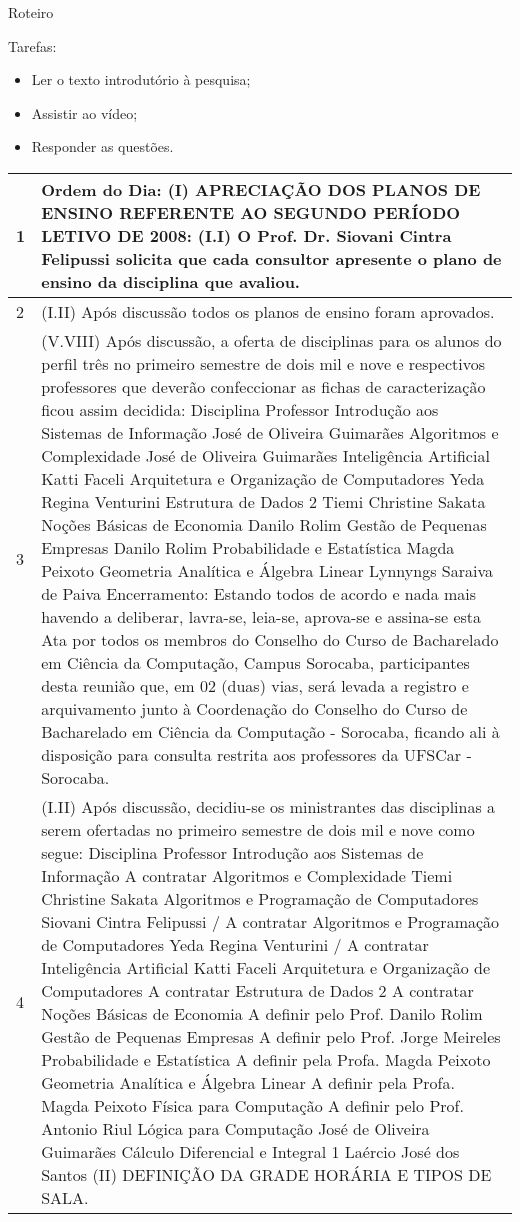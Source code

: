 \documentclass{article}
\begin{document}
Roteiro

Tarefas:

\begin{itemize}
	\item Ler o texto introdutório à pesquisa;
	\item Assistir ao vídeo;
	\item Responder as questões.
\end{itemize}





\begin{longtable}{|p{0.2cm}|p{17cm}|}
\hline 
1 & 
Ordem do Dia: (I) APRECIAÇÃO DOS PLANOS DE ENSINO REFERENTE AO SEGUNDO PERÍODO LETIVO DE 2008: (I.I) O Prof. Dr. Siovani Cintra Felipussi solicita que cada consultor apresente o plano de ensino da disciplina que avaliou.
 \\ \hline 
2 &
(I.II) Após discussão todos os planos de ensino foram aprovados.
 \\ \hline 
3 &
(V.VIII) Após discussão, a oferta de disciplinas para os alunos do perfil três no primeiro semestre de dois mil e nove e respectivos professores que deverão confeccionar as fichas de caracterização ficou assim decidida: Disciplina Professor Introdução aos Sistemas de Informação José de Oliveira Guimarães Algoritmos e Complexidade José de Oliveira Guimarães Inteligência Artificial Katti Faceli Arquitetura e Organização de Computadores Yeda Regina Venturini Estrutura de Dados 2 Tiemi Christine Sakata Noções Básicas de Economia Danilo Rolim Gestão de Pequenas Empresas Danilo Rolim Probabilidade e Estatística Magda Peixoto Geometria Analítica e Álgebra Linear Lynnyngs Saraiva de Paiva Encerramento: Estando todos de acordo e nada mais havendo a deliberar, lavra-se, leia-se, aprova-se e assina-se esta Ata por todos os membros do Conselho do Curso de Bacharelado em Ciência da Computação, Campus Sorocaba, participantes desta reunião que, em 02 (duas) vias, será levada a registro e arquivamento junto à Coordenação do Conselho do Curso de Bacharelado em Ciência da Computação - Sorocaba, ficando ali à disposição para consulta restrita aos professores da UFSCar - Sorocaba.
 \\ \hline 
4 &
(I.II) Após discussão, decidiu-se os ministrantes das disciplinas a serem ofertadas no primeiro semestre de dois mil e nove como segue: Disciplina Professor Introdução aos Sistemas de Informação A contratar Algoritmos e Complexidade Tiemi Christine Sakata Algoritmos e Programação de Computadores Siovani Cintra Felipussi / A contratar Algoritmos e Programação de Computadores Yeda Regina Venturini / A contratar Inteligência Artificial Katti Faceli Arquitetura e Organização de Computadores A contratar Estrutura de Dados 2 A contratar Noções Básicas de Economia A definir pelo Prof. Danilo Rolim Gestão de Pequenas Empresas A definir pelo Prof. Jorge Meireles Probabilidade e Estatística A definir pela Profa. Magda Peixoto Geometria Analítica e Álgebra Linear A definir pela Profa. Magda Peixoto Física para Computação A definir pelo Prof. Antonio Riul Lógica para Computação José de Oliveira Guimarães Cálculo Diferencial e Integral 1 Laércio José dos Santos (II) DEFINIÇÃO DA GRADE HORÁRIA E TIPOS DE SALA.

\end{longtable}
\end{document}
